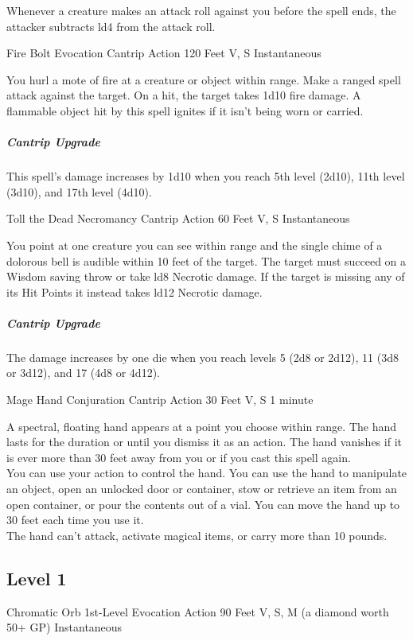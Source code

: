 \documentclass[letterpaper,openany,oneside,twocolumn]{book}
\begin{document}
Whenever a creature makes an attack roll against you before the spell ends, the attacker subtracts ld4 from the attack roll.

\DndSpellHeader
  {Fire Bolt}
  {Evocation Cantrip}
  {Action}
  {120 Feet}
  {V, S}
  {Instantaneous}

You hurl a mote of fire at a creature or object within range. Make a ranged spell attack against the target. On a hit, the target takes 1d10 fire damage. A flammable object hit by this spell ignites if it isn't being worn or carried.

\subparagraph*{Cantrip Upgrade} This spell's damage increases by 1d10 when you reach 5th level (2d10), 11th level (3d10), and 17th level (4d10).

\DndSpellHeader
  {Toll the Dead}
  {Necromancy Cantrip}
  {Action}
  {60 Feet}
  {V, S}
  {Instantaneous}

You point at one creature you can see within range and the single chime of a dolorous bell is audible within 10 feet of the target. The target must succeed on a Wisdom saving throw or take ld8 Necrotic damage. If the target is missing any of its Hit Points it instead takes ld12 Necrotic damage.

\subparagraph*{Cantrip Upgrade} The damage increases by one die when you reach levels 5 (2d8 or 2d12), 11 (3d8 or 3d12), and 17 (4d8 or 4d12).

\DndSpellHeader
  {Mage Hand}
  {Conjuration Cantrip}
  {Action}
  {30 Feet}
  {V, S}
  {1 minute}

A spectral, floating hand appears at a point you choose within range. The hand lasts for the duration or until you dismiss it as an action. The hand vanishes if it is ever more than 30 feet away from you or if you cast this spell again.\\
You can use your action to control the hand. You can use the hand to manipulate an object, open an unlocked door or container, stow or retrieve an item from an open container, or pour the contents out of a vial. You can move the hand up to 30 feet each time you use it.\\
The hand can’t attack, activate magical items, or carry more than 10 pounds.

\subsection*{Level 1}

\DndSpellHeader
  {Chromatic Orb}
  {1st-Level Evocation}
  {Action}
  {90 Feet}
  {V, S, M (a diamond worth 50+ GP)}
  {Instantaneous}
\end{document}
